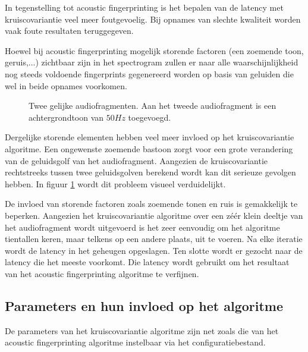 In tegenstelling tot acoustic fingerprinting is het bepalen van de latency met kruiscovariantie veel meer foutgevoelig. Bij opnames van slechte kwaliteit worden vaak foute resultaten teruggegeven. 

Hoewel bij acoustic fingerprinting mogelijk storende factoren (een zoemende toon, geruis,...) zichtbaar zijn in het spectrogram zullen er naar alle waarschijnlijkheid nog steeds voldoende fingerprints gegenereerd worden op basis van geluiden die wel in beide opnames voorkomen. 

\begin{figure}[h!]
	\captionsetup{width=0.7\textwidth}
	\caption[Zoemtoon van $50 Hz$]{Twee gelijke audiofragmenten. Aan het tweede audiofragment is een achtergrondtoon van $50 Hz$ toegevoegd.}
	\begin{center}
		\advance\parskip0.3cm
		
	\end{center}
	\label{zoemtoon}
\end{figure}

Dergelijke storende elementen hebben veel meer invloed op het kruiscovariantie algoritme. Een ongewenste zoemende bastoon zorgt voor een grote verandering van de geluidsgolf van het audiofragment. Aangezien de kruiscovariantie rechtstreeks tussen twee geluidsgolven berekend wordt kan dit serieuze gevolgen hebben. In figuur \ref{zoemtoon} wordt dit probleem visueel verduidelijkt.

De invloed van storende factoren zoals zoemende tonen en ruis is gemakkelijk te beperken. Aangezien het kruiscovariantie algoritme over een zéér klein deeltje van het audiofragment wordt uitgevoerd is het zeer eenvoudig om het algoritme tientallen keren, maar telkens op een andere plaats, uit te voeren. Na elke iteratie wordt de latency in het geheugen opgeslagen. Ten slotte wordt er gezocht naar de latency die het meeste voorkomt. Die latency wordt gebruikt om het resultaat van het acoustic fingerprinting algoritme te verfijnen.

\subsection{Parameters en hun invloed op het algoritme}

De parameters van het kruiscovariantie algoritme zijn net zoals die van het acoustic fingerprinting algoritme instelbaar via het configuratiebestand.

